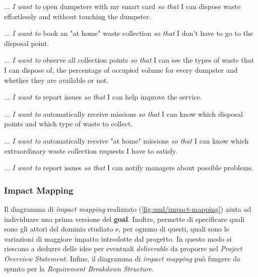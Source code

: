 \begin{story}
    ... \textit{I want to} open dumpsters with my smart card \textit{so that} I can dispose waste effortlessly and without touching the dumpster.
\end{story}
\begin{story}
    ... \textit{I want to} book an "at home" waste collection \textit{so that} I don't have to go to the disposal point.
\end{story}
\begin{story}
    ... \textit{I want to} observe all collection points \textit{so that} I can see the types of waste that I can dispose of, the percentage of occupied volume for every dumpster and whether they are available or not.
\end{story}
\begin{story}
    ... \textit{I want to} report issues \textit{so that} I can help improve the service.
\end{story}

\begin{story}
    ... \textit{I want to} automatically receive missions \textit{so that} I can know which disposal points and which type of waste to collect.
\end{story}
\begin{story}
    ... \textit{I want to} automatically receive "at home" missions \textit{so that} I can know which extraordinary waste collection requests I have to satisfy.
\end{story}
\begin{story}
    ... \textit{I want to} report issues \textit{so that} I can notify managers about possible problems.
\end{story}

\subsubsection{Impact Mapping}
Il diagramma di \textit{impact mapping} realizzato (\ref{fig:uml/impact-mapping}) aiuta ad individuare una prima versione del \textbf{goal}. Inoltre, permette di specificare quali sono gli attori del dominio studiato e, per ognuno di questi, quali sono le variazioni di maggiore impatto introdotte dal progetto. In questo modo si riescono a dedurre delle idee per eventuali \textit{deliverable} da proporre nel \textit{Project Overview Statement}. Infine, il diagramma di \textit{impact mapping} può fungere da spunto per la \textit{Requirement Breakdown Structure}.

